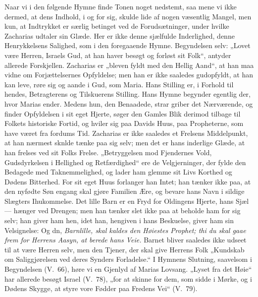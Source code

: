 \documentclass[12pt,a4paper]{book}
\begin{document}
Naar vi i den følgende Hymne finde Tonen noget nedstemt, saa mene vi ikke
dermed, at dens Indhold, i og for sig, skulde lide af nogen væsentlig Mangel, men
kun, at Indtrykket er særlig betinget ved de Forudsætninger, under hvilke
Zacharias udtaler sin Glæde. Her er ikke denne sjælfulde Inderlighed, denne
Henrykkelsens Salighed, som i den foregaaende Hymne. Begyndelsen selv: „Lovet
være Herren, Israels Gud, at han haver besøgt og
forløst sit Folk“, antyder allerede Forskjellen. Zacharias er „bleven fyldt med
den Hellig Aand“, at han maa vidne om Forjættelsernes Opfyldelse; men han er ikke
saaledes gudopfyldt, at han kan leve, røre sig og aande i Gud, som Maria. Hans
Stilling er, i Forhold til hendes, Betragterens og Tilskuerens Stilling. Hans
Hymne begynder egentlig der, hvor Marias ender. Medens hun, den Benaadede, strar
griber det Nærværende, og finder Opfyldelsen i sit eget Hjerte, søger den Gamles
Blik derimod tilbage til Folkets historiske Fortid, og hviler sig paa Davids
Huus, paa Propheterne, som have været fra fordums Tid. Zacharias er ikke saaledes
et Frelsens Middelpunkt, at han nærmest sknlde tænke paa sig selv; men det er
hans inderlige Glæde, at han frelses ved sit Folks Frelse. „Betryggelsen mod
Fjendernes Vold, Gudsdyrkelsen i Hellighed og Retfærdighed“ ere de Velgjerninger,
der fylde den Bedagede med Taknemmelighed, og lader ham glemme sit Livs Korthed
og Dødens Bitterhed. For sit eget Huus forlanger han Intet; han tænker ikke paa,
at den nyfødte Søn engang skal gjøre Familien Ære, og bevare hans Navn i sildige
Slægters Ihukommelse. Det lille Barn er en Fryd for Oldingens Hjerte, hans Sjæl
--- hænger ved Drengen; men han tænker slet ikke paa at beholde ham for sig selv;
%
han giver ham hen, idet han, hengiven i hans Beskuelse, giver ham sin
Velsignelse: Og dn, \emph{Barnlille, skal kaldes den Høiestes Prophet; thi du
skal gaae frem for Herrens Aasyn, at berede hans Veie.} Barnet bliver saaledes
ikke udseet til at være Herren selv, men den Tjener, der skal give Herrens Folk
„Kundskab om Saliggjørelsen ved deres Synders Forladelse.“ I Hymnens Slutning,
saavelsom i Begyndelsen (V.\ 66), høre vi en Gjenlyd af Marias Lovsang. „Lyset
fra det Høie“ har allerede besøgt Israel (V.\ 78), „for at skinne for dem, som
sidde i
Mørke, og i Dødens Skygge, at styre vore Fødder paa Fredens Vei“ (V.\ 79).
\end{document}
